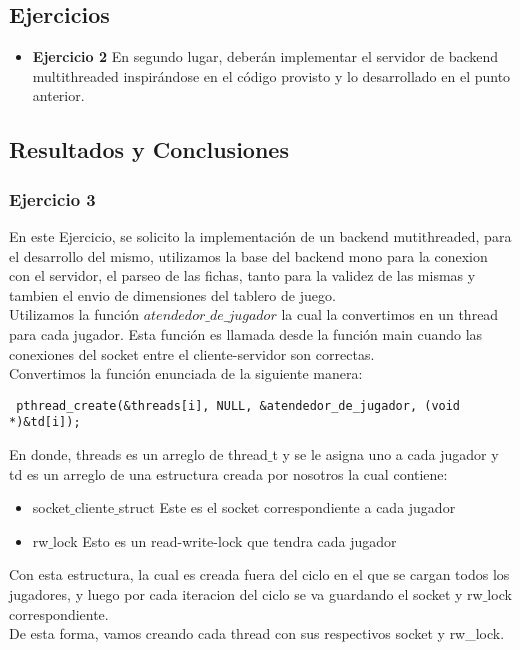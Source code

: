
\subsection{Ejercicios}
\begin{itemize}
 \item 
\textbf{Ejercicio 2}
En segundo lugar, deberán implementar el servidor de backend multithreaded inspirándose en el código provisto y lo 
desarrollado en el punto anterior.
\end{itemize}

\subsection{Resultados y Conclusiones}


\subsubsection[Resolución Ejercicio 2]{Ejercicio 3}

\indent En este Ejercicio, se solicito la implementación de un backend mutithreaded, para el desarrollo del mismo,
utilizamos la base del backend mono para la conexion con el servidor, el parseo de las fichas, tanto para la validez de las mismas
y tambien el envio de dimensiones del tablero de juego.\\

Utilizamos la función $atendedor\_de\_jugador$ la cual la convertimos en un thread para cada jugador. Esta función es llamada desde
la función main cuando las conexiones del socket entre el cliente-servidor son correctas. \\
Convertimos la función enunciada de la siguiente manera:\\
\begin{verbatim}
 pthread_create(&threads[i], NULL, &atendedor_de_jugador, (void *)&td[i]);
\end{verbatim}

En donde, threads es un arreglo de thread$\_$t y se le asigna uno a cada jugador y td es un arreglo de una estructura creada por
nosotros la cual contiene:
\begin{itemize}
 \item socket$\_$cliente$\_$struct Este es el socket correspondiente a cada jugador
 \item rw$\_$lock Esto es un read-write-lock que tendra cada jugador
\end{itemize}

Con esta estructura, la cual es creada fuera del ciclo en el que se cargan todos los jugadores, y luego por cada iteracion 
del ciclo se va guardando el socket y rw$\_$lock correspondiente.\\
De esta forma, vamos creando cada thread con sus respectivos socket y rw\_lock.\\

